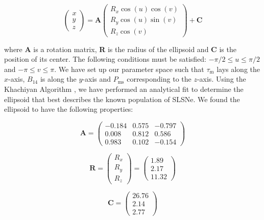 \begin{equation}
\label{eq:Ellipsoid}
\left( \begin{matrix}
x \\
y \\
z
\end{matrix} \right)
=
\mathbf{A}
\left( \begin{matrix}
R_x\cos(u)\cos(v) \\
R_y\cos(u)\sin(v) \\
R_z\cos(v)
\end{matrix} \right)
+ \mathbf{C}
\end{equation}

\noindent where \textbf{A} is a rotation matrix, \textbf{R} is the radius of the ellipsoid and \textbf{C} is the position of its center. The following conditions must be satisfied: $-\pi /2 \leq u \leq \pi /2$ and $-\pi \leq v \leq \pi$. We have set up our parameter space such that $\tau_\mathrm{m}$ lays along the $x$-axis, $B_{14}$ is along the $y$-axis and $P_{\mathrm{ms}}$ corresponding to the $z$-axis. Using the Khachiyan Algorithm \citep{Aspvall19801,KHACHIYAN198053}, we have performed an analytical fit to determine the ellipsoid that best describes the known population of SLSNe. We found the ellipsoid to have the following properties:

\begin{equation}
\label{eq:A}
\mathbf{A} =
\left( \begin{matrix}
-0.184 & 0.575 & -0.797\\
 0.008 & 0.812 & 0.586\\
0.983 & 0.102 & -0.154
\end{matrix} \right)
\end{equation}

\begin{equation}
\label{eq:R}
\mathbf{R} =
\left( \begin{matrix}
R_x \\
R_y \\
R_z
\end{matrix} \right)
=
\left( \begin{matrix}
1.89\\
2.17\\
11.32
\end{matrix} \right)
\end{equation}

\begin{equation}
\label{eq:C}
\mathbf{C} =
\left( \begin{matrix}
26.76 \\
2.14\\
2.77
\end{matrix} \right)
\end{equation}


